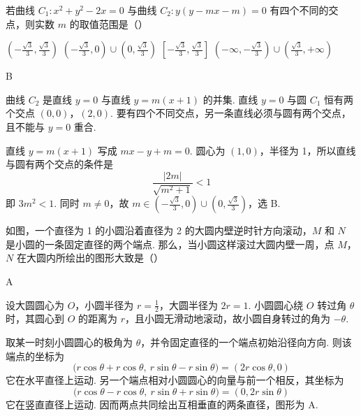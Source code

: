 \begin{problem}
若曲线 \(C_{1}: x^{2} + y^{2} - 2x = 0\) 与曲线 \(C_{2}: y (y - mx - m) = 0\) 有四个不同的交点，则实数 \(m\) 的取值范围是（\quad）

\choices
    {\(\left(-\frac{\sqrt{3}}{3}, \frac{\sqrt{3}}{3}\right)\)}
    {\(\left(-\frac{\sqrt{3}}{3}, 0\right) \cup \left(0, \frac{\sqrt{3}}{3}\right)\)}
    {\(\left[-\frac{\sqrt{3}}{3}, \frac{\sqrt{3}}{3}\right]\)}
    {\(\left(-\infty, -\frac{\sqrt{3}}{3}\right) \cup \left(\frac{\sqrt{3}}{3}, +\infty\right)\)}
\end{problem}

\begin{answer}
B
\end{answer}

\begin{solution}
曲线 \(C_2\) 是直线 \(y=0\) 与直线 \(y=m(x+1)\) 的并集. 直线
\(y=0\) 与圆 \(C_1\) 恒有两个交点 \((0,0)\)，\((2,0)\). 要有四个不同交点，另一条直线必须与圆有两个交点，且不能与 \(y=0\) 重合.

直线 \(y=m(x+1)\) 写成 \(mx-y+m=0\). 圆心为 \((1,0)\)，半径为 1，所以直线与圆有两个交点的条件是
\[
\frac{|2m|}{\sqrt{m^2+1}}<1
\]
即 \(3m^2<1\). 同时 \(m\neq 0\)，故
\(m\in\left(-\frac{\sqrt{3}}{3},0\right)\cup\left(0,\frac{\sqrt{3}}{3}\right)\)，选 B.
\end{solution}

\begin{problem}
如图，一个直径为 1 的小圆沿着直径为 2 的大圆内壁逆时针方向滚动，\(M\) 和 \(N\) 是小圆的一条固定直径的两个端点. 那么，当小圆这样滚过大圆内壁一周，点 \(M\)，\(N\) 在大圆内所绘出的图形大致是（\quad）


    {}
    {}
    {}
\end{problem}

\begin{answer}
A
\end{answer}

\begin{solution}
设大圆圆心为 \(O\)，小圆半径为 \(r=\frac{1}{2}\)，大圆半径为 \(2r=1\). 小圆圆心绕 \(O\) 转过角 \(\theta\) 时，其圆心到 \(O\) 的距离为 \(r\)，且小圆无滑动地滚动，故小圆自身转过的角为 \(-\theta\).

取某一时刻小圆圆心的极角为 \(\theta\)，并令固定直径的一个端点初始沿径向方向. 则该端点的坐标为
\[
\bigl(r\cos\theta+r\cos\theta,\ r\sin\theta-r\sin\theta\bigr)=(2r\cos\theta,0)
\]
它在水平直径上运动. 另一个端点相对小圆圆心的向量与前一个相反，其坐标为
\[
\bigl(r\cos\theta-r\cos\theta,\ r\sin\theta+r\sin\theta\bigr)=(0,2r\sin\theta)
\]
它在竖直直径上运动. 因而两点共同绘出互相垂直的两条直径，图形为 A.
\end{solution}

